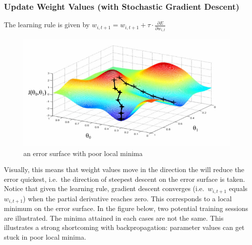\documentclass[a4paper,11pt]{article}
\begin{document}
\subsubsection{Update Weight Values (with Stochastic Gradient Descent)}

The learning rule is given by $w_{i,t+1} = w_{i,t+1} + \tau \cdot \frac{\partial{E}}{\partial{w_{i,t}}}$

\begin{figure}[h!]
	\centering
	\includegraphics[scale=0.8]{images/local_minima.png}
	\caption{an error surface with poor local minima}
\end{figure}

Visually, this means that weight values move in the direction the will reduce the error quickest, i.e.\ the direction of steepest descent on the error surface is taken. Notice that given the learning rule, gradient descent converges (i.e.\ $w_{i,t+1}$ equals $w_{i,t+1}$) when the partial derivative reaches zero. This corresponds to a local minimum on the error surface. In the figure below, two potential training sessions are illustrated. The minima attained in each cases are not the same. This illustrates a strong shortcoming with backpropagation: parameter values can get stuck in poor local minima.
\end{document}
